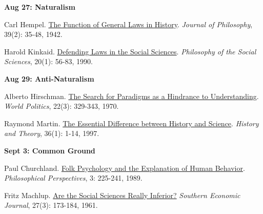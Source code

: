 \documentclass[letterpaper]{article}
\renewenvironment{itemize}{
  \begin{list}{}{
    \setlength{\leftmargin}{1.5em}
  }
}{
  \end{list}
}
\begin{document}
\begin{enumerate}
		\begin{itemize}
		\item {\bf Aug 27: Naturalism}
			\begin{itemize}
					\item[$\bullet$] Carl Hempel. \href{https://www.jstor.org/stable/pdf/2017635.pdf}{The Function of General Laws in History}. \emph{Journal of Philosophy}, 39(2): 35-48, 1942.
					\item[$\bullet$] Harold Kinkaid. \href{http://journals.sagepub.com/doi/pdf/10.1177/004839319002000104}{Defending Laws in the Social Sciences}. \emph{Philosophy of the Social Sciences}, 20(1): 56-83, 1990.
			\end{itemize}
		\end{itemize}


		\begin{itemize}
		\item {\bf Aug 29: Anti-Naturalism}
			\begin{itemize}
					\item[$\bullet$] Alberto Hirschman. \href{http://www.jstor.org/stable/2009600}{The Search for Paradigms as a Hindrance to Understanding}. \emph{World Politics}, 22(3): 329-343, 1970. 
					\item[$\bullet$] Raymond Martin. \href{http://www.jstor.org/stable/2505422}{The Essential Difference between History and Science}. \emph{History and Theory}, 36(1): 1-14, 1997. 
			\end{itemize}
		\end{itemize}


		\begin{itemize}
		\item {\bf Sept 3: Common Ground}
			\begin{itemize}
					\item[$\bullet$] Paul Churchland. \href{http://www.jstor.org/stable/2214269}{Folk Psychology and the Explanation of Human Behavior}. \emph{Philosophical Perspectives}, 3: 225-241, 1989. 
					\item[$\bullet$] Fritz Machlup. \href{http://www.jstor.org/stable/1055084}{Are the Social Sciences Really Inferior?} \emph{Southern Economic Journal}, 27(3): 173-184, 1961. 
			\end{itemize}
		\end{itemize}



\end{enumerate}
\end{document}
